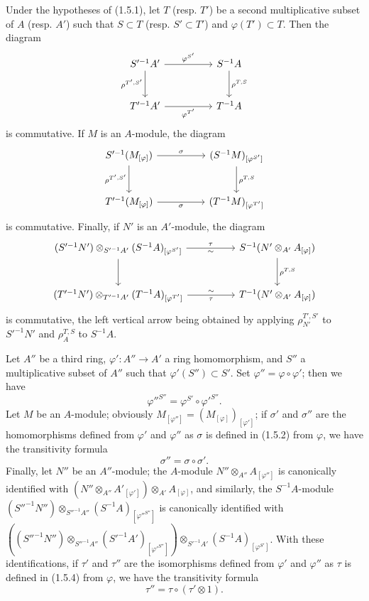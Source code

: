 \begin{env}[1.5.6]
\label{0.1.5.6}
Under the hypotheses of (1.5.1), let $T$ (resp. $T'$) be a second multiplicative
subset of $A$ (resp. $A'$) such that $S\subset T$ (resp. $S'\subset T'$)
and $\varphi(T')\subset T$. Then the diagram
\[
\begin{tikzcd}[column sep=huge,row sep=large]
S'^{-1}A' \arrow[r,"\varphi^{S'}"] \arrow[d,"\rho^{T',S'}"']
  & S^{-1}A \arrow[d,"\rho^{T,S}"] \\
T'^{-1}A' \arrow[r,"\varphi^{T'}"']
  & T^{-1}A
\end{tikzcd}
\]
is commutative. If $M$ is an $A$-module, the diagram
\[
\begin{tikzcd}[column sep=huge,row sep=large]
S'^{-1}(M_{[\varphi]}) \arrow[r,"\sigma"] \arrow[d,"\rho^{T',S'}"']
  & (S^{-1}M)_{[\varphi^{S'}]} \arrow[d,"\rho^{T,S}"] \\
T'^{-1}(M_{[\varphi]}) \arrow[r,"\sigma"']
  & (T^{-1}M)_{[\varphi^{T'}]}
\end{tikzcd}
\]
is commutative. Finally, if $N'$ is an $A'$-module, the diagram
\[
\begin{tikzcd}[column sep=huge,row sep=large]
(S'^{-1}N')\otimes_{S'^{-1}A'}(S^{-1}A)_{[\varphi^{S'}]}
  \arrow[r,"\tau","{\sim}"'] \arrow[d]
  & S^{-1}(N'\otimes_{A'}A_{[\varphi]}) \arrow[d,"\rho^{T,S}"] \\
(T'^{-1}N')\otimes_{T'^{-1}A'}(T^{-1}A)_{[\varphi^{T'}]}
  \arrow[r,"\tau"',"{\sim}"]
  & T^{-1}(N'\otimes_{A'}A_{[\varphi]})
\end{tikzcd}
\]
is commutative, the left vertical arrow being obtained by applying
$\rho_{N'}^{T',S'}$ to $S'^{-1}N'$ and $\rho_A^{T,S}$ to $S^{-1}A$.
\end{env}


\begin{env}[1.5.7]
\label{0.1.5.7}
Let $A''$ be a third ring, $\varphi':A''\to A'$ a ring
homomorphism, and $S''$ a multiplicative subset of $A''$ such that
$\varphi'(S'')\subset S'$. Set $\varphi''=\varphi\circ\varphi'$; then we have
\[
  \varphi''^{S''}=\varphi^{S'}\circ\varphi'^{S''}.
\]
Let $M$ be an $A$-module; obviously
$M_{[\varphi'']}=(M_{[\varphi]})_{[\varphi']}$; if $\sigma'$ and $\sigma''$ are
the homomorphisms defined from $\varphi'$ and $\varphi''$ as $\sigma$
is defined in (1.5.2) from $\varphi$, we have the transitivity formula
\[
  \sigma''=\sigma\circ\sigma'.
\]
Finally, let $N''$ be an $A''$-module; the $A$-module
$N''\otimes_{A''}A_{[\varphi'']}$ is canonically identified with $(N''\otimes_{A''}A'_{[\varphi']})\otimes_{A'}A_{[\varphi]}$,
and similarly, the $S^{-1}A$-module $(S''^{-1}N'')\otimes_{S''^{-1}A''}(S^{-1}A)_{[\varphi''^{S''}]}$
is canonically identified with $((S''^{-1}N'')\otimes_{S''^{-1}A''}(S'^{-1}A')_{[\varphi'^{S''}]})\otimes_{S'^{-1}A'}(S^{-1}A)_{[\varphi^{S'}]}$.
With these identifications, if $\tau'$ and $\tau''$ are the isomorphisms defined
from $\varphi'$ and $\varphi''$ as $\tau$ is defined in (1.5.4) from
$\varphi$, we have the transitivity formula
\[
  \tau''=\tau\circ(\tau'\otimes 1).
\]
\end{env}


